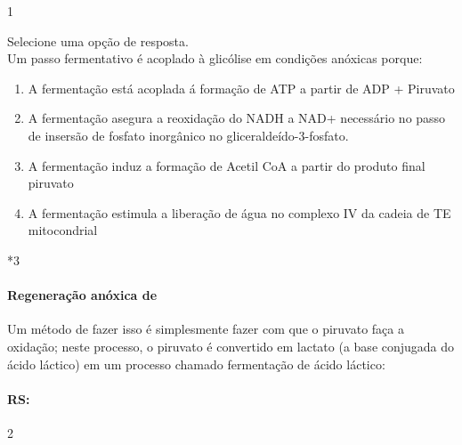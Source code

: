 \documentclass[\mainfilename]{subfiles}
\begin{document}
\begin{questionBox}1{}
    
    Selecione uma opção de resposta.\\
    
    Um passo fermentativo é acoplado à glicólise em condições anóxicas porque:
    \begin{enumerate}
        \item A fermentação está acoplada á formação de ATP a partir de ADP + Piruvato
        \item A fermentação asegura a reoxidação do NADH a NAD+ necessário no passo de insersão de fosfato inorgânico no gliceraldeído-3-fosfato.
        \item A fermentação induz a formação de Acetil CoA a partir do produto final piruvato
        \item A fermentação estimula a liberação de água no complexo IV da cadeia de TE mitocondrial
    \end{enumerate}

    \vspace{-5ex}
    \begin{questionBox}*3{}
        
        \paragraph{Regeneração anóxica de }
        Um método de fazer isso é simplesmente fazer com que o piruvato faça a oxidação; neste processo, o piruvato é convertido em lactato (a base conjugada do ácido láctico) em um processo chamado fermentação de ácido láctico:\\

        
    \end{questionBox}

    \paragraph{RS:}2
    
\end{questionBox}
\end{document}
